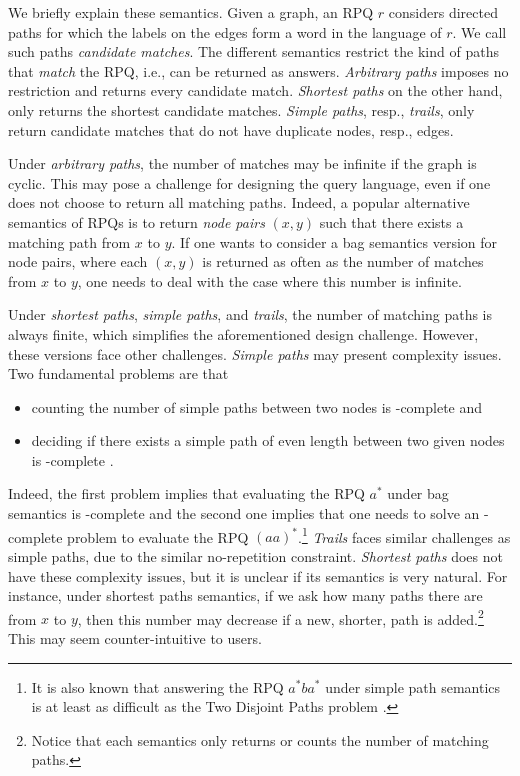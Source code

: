 \documentclass[a4paper,english]{lipics-v2016}
\theoremstyle{plain}
\begin{document}
We briefly explain these semantics. Given a graph, an RPQ $r$
considers directed paths for which the labels on the edges form a
word in the language of $r$. We call such paths \emph{candidate matches}. The different semantics restrict the kind of paths that
\emph{match} the RPQ, i.e., can be returned as answers. \emph{Arbitrary paths} imposes no restriction and
returns every candidate match. \emph{Shortest paths} on the other hand, only returns the
shortest candidate matches. \emph{Simple paths}, resp., \emph{trails}, only
return candidate matches that do not have duplicate nodes, resp., edges.

Under \emph{arbitrary paths}, the number of matches may be infinite if
the graph is cyclic. This may pose a challenge for designing the query
language, even if one does not choose to return all matching
paths. Indeed, a popular alternative semantics of RPQs is to return
\emph{node pairs} $(x,y)$ such that there exists a matching path
from $x$ to $y$. If one wants to consider a bag semantics version for
node pairs,
where each $(x,y)$ is returned as often as the number of matches from $x$ to $y$, one needs to deal with the case where this
number is infinite.

Under \emph{shortest paths}, \emph{simple paths}, and \emph{trails}, the number of
matching paths is always finite, which simplifies the aforementioned
design challenge. However, these versions face other challenges. \emph{Simple paths} may present complexity
issues. Two fundamental problems  are that
\begin{itemize}
\item counting the number of simple paths between two nodes is
  \sharpp-complete \cite{valiant} and
\item deciding if there exists a simple path of even length between
  two given nodes is \np-complete \cite{lapaugh-papadimitriou}.
\end{itemize}
Indeed, the first problem implies that evaluating the RPQ $a^*$ under
bag semantics is \sharpp-complete and the second one implies that one
needs to solve an \np-complete problem to evaluate the RPQ
$(aa)^*$.\footnote{It is also known that answering the RPQ $a^*ba^*$
  under simple path semantics is at least as difficult as the
  \textsf{Two Disjoint Paths} problem \cite{mendelzon}.}
\emph{Trails} faces similar challenges as simple paths, due to the
similar no-repetition constraint. \emph{Shortest paths} does not have
these complexity issues, but it is unclear if its semantics is very
natural. For instance, under shortest paths semantics, if we ask how
many paths there are from $x$ to $y$, then this number may decrease if
a new, shorter, path is added.\footnote{Notice that each semantics
  only returns or counts the number of matching paths.} This may seem
counter-intuitive to users.
\end{document}
